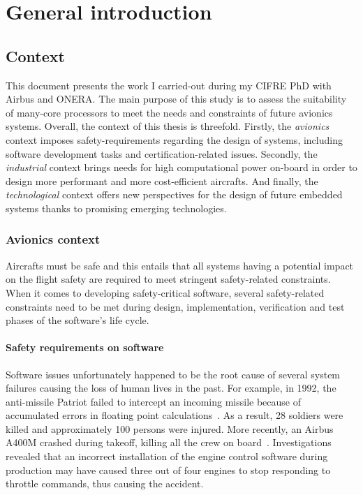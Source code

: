 \documentclass[main.tex]{subfiles}
\begin{document}
\chapter{General introduction}
\thispagestyle{chapstyle}
\minitoc



\section{Context} This document presents the work I carried-out during my CIFRE
PhD with Airbus and ONERA. The main purpose of this study is to assess the
suitability of many-core processors to meet the needs and constraints of future
avionics systems.  Overall, the context of this thesis is threefold. Firstly,
the \emph{avionics} context imposes safety-requirements regarding the design of
systems, including software development tasks and certification-related issues.
Secondly, the \emph{industrial} context brings needs for high computational
power on-board in order to design more performant and more cost-efficient
aircrafts. And finally, the \emph{technological} context offers new
perspectives for the design of future embedded systems thanks to promising
emerging technologies.


\subsection{Avionics context} Aircrafts must be safe and this entails that all
systems having a potential impact on the flight safety are required to meet
stringent safety-related constraints. When it comes to developing
safety-critical software, several safety-related constraints need to be met
during design, implementation, verification and test phases of the software's
life cycle.


\subsubsection{Safety requirements on software} Software issues unfortunately
happened to be the root cause of several system failures causing the loss of
human lives in the past. For example, in 1992, the anti-missile {\sc Patriot}
failed to intercept an incoming missile because of accumulated errors in
floating point calculations~\cite{MissilePatriot}. As a result, 28 soldiers
were killed and approximately 100 persons were injured. More recently, an
Airbus A400M crashed during takeoff, killing all the crew on
board~\cite{CrashA400M}. Investigations revealed that an incorrect installation
of the engine control software during production may have caused three out of
four engines to stop responding to throttle commands, thus causing the
accident.
\end{document}
